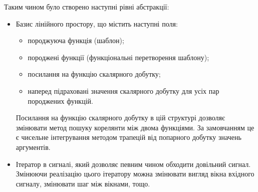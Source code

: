     Таким чином було створено наступні рівні абстракції:
    \begin{itemize}
        \item Базис лінійного простору, що містить наступні поля:
            \begin{itemize}
                \item породжуюча функція (шаблон);
                \item породжені функції (функціональні перетворення шаблону);
                \item посилання на функцію скалярного добутку;
                \item наперед підраховані значення скалярного добутку для усіх пар породжених функцій.
            \end{itemize}

            Посилання на функцію скалярного добутку в цій структурі дозволяє змінювати метод пошуку корелянти між
            двома функціями.
            За замовчанням це є чисельне інтегрування методом трапецій від попарного добутку значень аргументів.
        \item Ітератор в сигналі, який дозволяє певним чином обходити довільний сигнал.
            Змінюючи реалізацію цього ітератору можна змінювати вигляд вікна вхідного сигналу, змінювати шаг між
            вікнами, тощо.
    \end{itemize}

